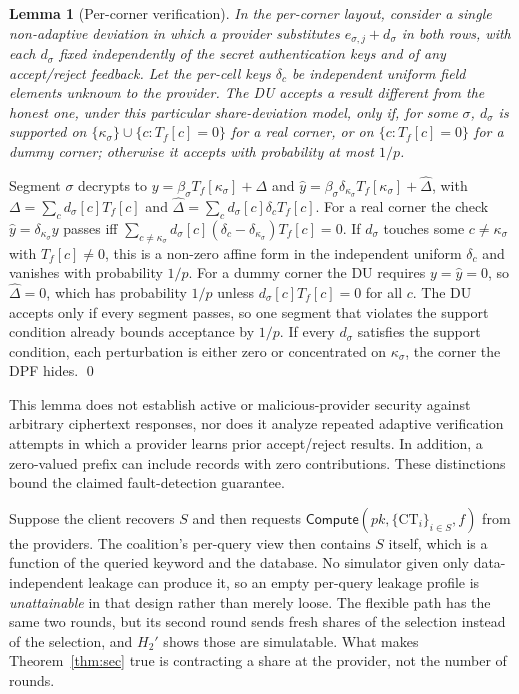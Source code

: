 \documentclass[a4paper,fleqn]{cas-sc}
\newtheorem{lemma}{Lemma}
\newcommand{\Compute}{\mathsf{Compute}}
\begin{document}
\begin{lemma}[Per-corner verification]
\label{lem:cornermac}
In the per-corner layout, consider a single non-adaptive deviation
in which a provider substitutes $e_{\sigma,j}+d_\sigma$
\emph{in both rows}, with each $d_\sigma$ fixed independently of the
secret authentication keys and of any accept/reject feedback.
Let the per-cell keys $\delta_c$ be independent uniform field elements
unknown to the provider. The DU
accepts a result different from the honest one, under
this particular share-deviation model, only if, for some $\sigma$,
$d_\sigma$ is supported on $\{\kappa_\sigma\}\cup\{c: T_f[c]=0\}$ for a real
corner, or on $\{c: T_f[c]=0\}$ for a dummy corner; otherwise it accepts with
probability at most $1/p$.
\end{lemma}
\begin{pf}
Segment $\sigma$ decrypts to $y=\beta_\sigma T_f[\kappa_\sigma]+\Delta$ and
$\hat y=\beta_\sigma\delta_{\kappa_\sigma}T_f[\kappa_\sigma]+\hat\Delta$, with
$\Delta=\sum_c d_\sigma[c]T_f[c]$ and $\hat\Delta=\sum_c
d_\sigma[c]\delta_cT_f[c]$. For a real corner the check $\hat
y=\delta_{\kappa_\sigma}y$ passes iff
$\sum_{c\ne\kappa_\sigma}d_\sigma[c](\delta_c-\delta_{\kappa_\sigma})T_f[c]=0$.
If $d_\sigma$ touches some $c\ne\kappa_\sigma$ with $T_f[c]\ne0$, this is a
non-zero affine form in the independent uniform $\delta_c$ and vanishes with
probability $1/p$. For a dummy corner the DU requires $y=\hat y=0$, so
$\hat\Delta=0$, which has probability $1/p$ unless $d_\sigma[c]T_f[c]=0$ for all
$c$. The DU accepts only if every segment passes, so one segment that
violates the support condition already bounds acceptance by $1/p$. If every
$d_\sigma$
satisfies the support condition, each perturbation is either zero or
concentrated on $\kappa_\sigma$, the corner the DPF hides. \qed
\end{pf}
This lemma does not establish active or malicious-provider security
against arbitrary ciphertext responses, nor does it analyze repeated
adaptive verification attempts in which a provider learns prior
accept/reject results. In addition, a zero-valued prefix can
include records with zero contributions. These distinctions bound
the claimed fault-detection guarantee.

\begin{remark}
\label{rem:v1}
Suppose the client recovers $S$ and then requests
$\Compute(pk,\{\text{CT}_i\}_{i\in S},f)$ from the providers. The coalition's
per-query view then contains $S$ itself, which is a function of the queried
keyword and the database. No simulator given only data-independent leakage can
produce it, so an empty per-query leakage profile is \emph{unattainable} in
that design rather than merely loose. The flexible path has the same two
rounds, but its second round sends fresh shares of the selection instead of
the selection, and $H_2'$ shows those are simulatable. What makes
Theorem~\ref{thm:sec} true is contracting a share at the provider, not the
number of rounds.
\end{remark}
\end{document}
